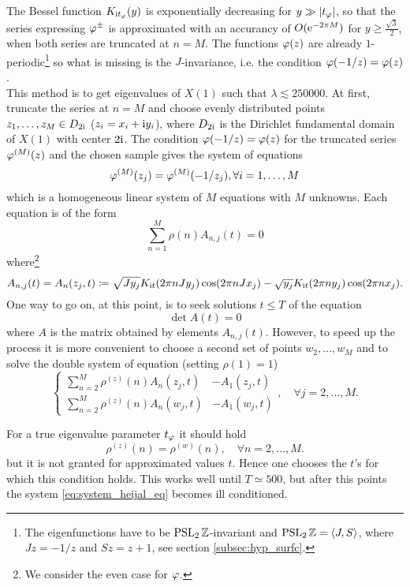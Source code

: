 The Bessel function $K_{\mathrm{i} t_{\varphi}}(y)$ is exponentially decreasing for $y\gg\left| t_{\varphi}\right|$, so that the series expressing $\varphi^{\pm}$ is approximated with an accurancy of $O(\mathrm{e}^{-2\pi M})$ for $y\geq\frac{\sqrt{3}}{2}$, when both series are truncated at $n=M$. The functions $\varphi(z)$ are already $1$-periodic\footnote{The eigenfunctions have to be $\operatorname{PSL}_{2}\mathbb{Z}$-invariant and $\operatorname{PSL}_{2}\mathbb{Z}=\left< J,S\right>$, where $Jz=-1/z$ and $Sz=z+1$, see section \ref{subsec:hyp_surfc}.} so what is missing is the $J$-invariance, i.e. the condition $\varphi(-1/z)=\varphi(z)$.\\
This method is  to get eigenvalues of $X(1)$ such that $\lambda\lesssim 250000$. At first, truncate the series at $n=M$ and choose evenly distributed points $z_{1},\ldots,z_{M}\in D_{2\mathrm{i}}$ ($z_{i}=x_{i}+\mathrm{i} y_{i}$), where $D_{2\mathrm{i}}$ is the Dirichlet fundamental domain of $X(1)$ with center $2\mathrm{i}$. The condition $\varphi(-1/z)=\varphi(z)$ for the truncated series $\varphi^{(M)}(z)$ and the chosen sample gives the system of equations
\[
\varphi^{(M)}(z_{j})=\varphi^{(M)}(-1/z_{j}),\forall i=1,\ldots, M
\] 
which is a homogeneous linear system of $M$ equations with $M$ unknowns. Each equation is of the form
\[
\sum_{n=1}^{M}\rho(n)A_{n,j}(t)=0
\]
where\footnote{We consider the even case for $\varphi$.}
\[
A_{n,j}(t)=A_{n}(z_{j},t)\coloneqq\sqrt{Jy_{j}}K_{\mathrm{i} t}(2\pi n Jy_{j})\cos(2\pi nJx_{j})-\sqrt{y_{j}}K_{\mathrm{i} t}(2\pi n y_{j})\cos(2\pi nx_{j}).
\]
One way to go on, at this point, is to seek solutions $t\leq T$ of the equation 
\[
\det A(t)=0
\]
where $A$ is the matrix obtained by elements $A_{n,j}(t)$. However, to speed up the process it is more convenient to choose a second set of points $w_{2},\ldots,w_{M}$ and to solve the double system of equation (setting $\rho(1)=1$)
\begin{equation}
\label{eq:system_heijal_eq}
\begin{cases}
\sum_{n=2}^{M}\rho^{(z)}(n)A_{n}(z_{j},t)&-A_{1}(z_{j},t)\\
\sum_{n=2}^{M}\rho^{(z)}(n)A_{n}(w_{j},t)&-A_{1}(w_{j},t)
\end{cases}
,\quad\forall j=2,\ldots,M.
\end{equation}

For a true eigenvalue parameter $t_{\varphi}$ it should hold
\[
\rho^{(z)}(n)=\rho^{(w)}(n),\quad \forall n=2,\ldots,M.
\]
but it is not granted for approximated values $t$. Hence one chooses the $t$'s for which this condition holds. This works well until $T\simeq 500$, but after this points the system \eqref{eq:system_heijal_eq} becomes ill conditioned.


